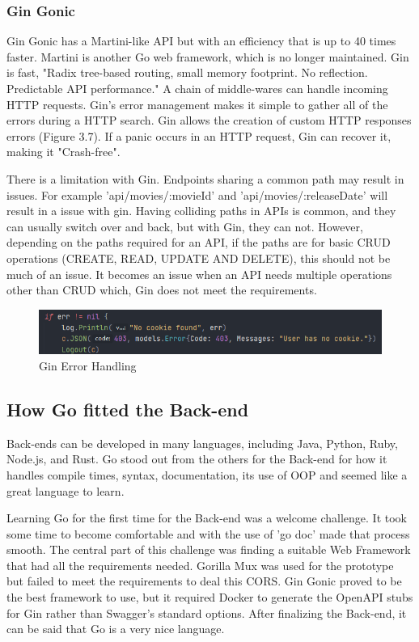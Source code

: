 \subsubsection{Gin Gonic}
Gin Gonic has a Martini-like API but with an efficiency that is up to 40 times faster. Martini is another Go web framework, which is no longer maintained. Gin is fast, "Radix tree-based routing, small memory footprint. No reflection. Predictable API performance." A chain of middle-wares can handle incoming HTTP requests. Gin's error management makes it simple to gather all of the errors during a HTTP search. Gin allows the creation of custom HTTP responses errors (Figure 3.7). If a panic occurs in an HTTP request, Gin can recover it, making it "Crash-free". \cite{ref9} 

There is a limitation with Gin. Endpoints sharing a common path may result in issues. For example 'api/movies/:movieId' and 'api/movies/:releaseDate' will result in a issue with gin. Having colliding paths in APIs is common, and they can usually switch over and back, but with Gin, they can not. However, depending on the paths required for an API, if the paths are for basic CRUD operations (CREATE, READ, UPDATE AND DELETE), this should not be much of an issue. It becomes an issue when an API needs multiple operations other than CRUD which, Gin does not meet the requirements. 

\begin{figure}[H]
    \caption{Gin Error Handling}
    \label{image:ginError}
    \centering
    \includegraphics[width=1.0\textwidth]{images/misc/cookie-error.png}
\end{figure}

\subsection{How Go fitted the Back-end}
Back-ends can be developed in many languages, including Java, Python, Ruby, Node.js, and Rust. Go stood out from the others for the Back-end for how it handles compile times, syntax, documentation, its use of OOP and seemed like a great language to learn. 

Learning Go for the first time for the Back-end was a welcome challenge. It took some time to become comfortable and with the use of 'go doc' made that process smooth. The central part of this challenge was finding a suitable Web Framework that had all the requirements needed. Gorilla Mux was used for the prototype but failed to meet the requirements to deal this CORS.
Gin Gonic proved to be the best framework to use, but it required Docker to generate the OpenAPI stubs for Gin rather than Swagger's standard options. After finalizing the Back-end, it can be said that Go is a very nice language. 
 
